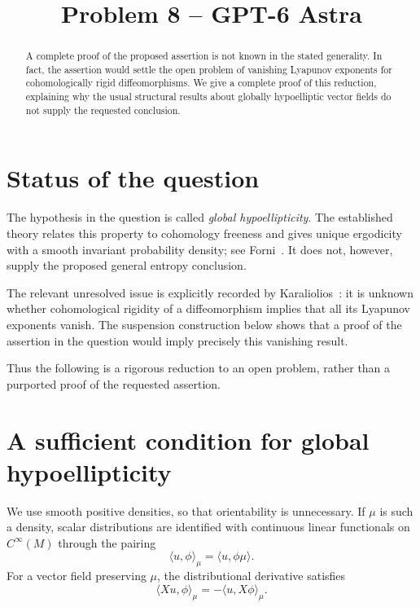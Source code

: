 \documentclass[11pt]{article}
\title{Problem 8 -- GPT-6 Astra}
\author{}
\date{}
\theoremstyle{definition}
\theoremstyle{remark}
\begin{document}
\maketitle

\begin{abstract}
A complete proof of the proposed assertion is not known in the stated
generality. In fact, the assertion would settle the open problem of
vanishing Lyapunov exponents for cohomologically rigid diffeomorphisms.
We give a complete proof of this reduction, explaining why the usual
structural results about globally hypoelliptic vector fields do not
supply the requested conclusion.
\end{abstract}

\section{Status of the question}

The hypothesis in the question is called \emph{global hypoellipticity}.
The established theory relates this property to cohomology freeness and
gives unique ergodicity with a smooth invariant probability density;
see Forni~\cite[Proposition~2.4 and Theorem~3.10]{Forni}.
It does not, however, supply the proposed general entropy conclusion.

The relevant unresolved issue is explicitly recorded by
Karaliolios~\cite[Introduction, p.~6]{Karaliolios}: it is unknown whether
cohomological rigidity of a diffeomorphism implies that all its Lyapunov
exponents vanish. The suspension construction below shows that a proof
of the assertion in the question would imply precisely this vanishing
result.

Thus the following is a rigorous reduction to an open problem, rather
than a purported proof of the requested assertion.

\section{A sufficient condition for global hypoellipticity}

We use smooth positive densities, so that orientability is unnecessary.
If $\mu$ is such a density, scalar distributions are identified with
continuous linear functionals on $C^\infty(M)$ through the pairing
\[
 \langle u,\phi\rangle_\mu
 =
 \langle u,\phi\mu\rangle.
\]
For a vector field preserving $\mu$, the distributional derivative
satisfies
\[
 \langle Xu,\phi\rangle_\mu
 =
 -\langle u,X\phi\rangle_\mu.
\]
\end{document}
